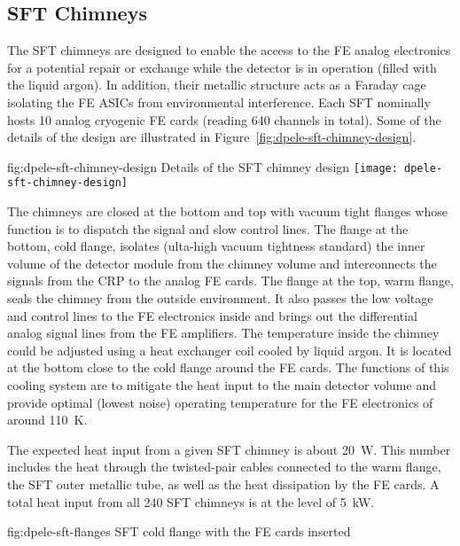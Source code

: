\subsection{SFT Chimneys}
\label{sec:fddp-tpc-elec-design-sft}

The SFT chimneys are designed to enable the access to the FE analog electronics for a potential repair or exchange while the detector is in operation (filled with the liquid argon). In addition, their metallic structure acts as a Faraday cage isolating the FE ASICs from environmental interference.  Each SFT nominally hosts \num{10} analog cryogenic FE cards (reading \num{640} channels in total).  Some of the details of the design are illustrated in Figure~\ref{fig:dpele-sft-chimney-design}. 

\begin{dunefigure}{fig:dpele-sft-chimney-design}
{Details of the SFT chimney design}
\texttt{[image: dpele-sft-chimney-design]}
\end{dunefigure}

The chimneys are closed at the bottom and top with vacuum tight flanges whose function is to dispatch the signal and slow control lines. The flange at the bottom, cold flange, isolates (ulta-high vacuum tightness standard) the inner volume of the detector module from the chimney volume and interconnects the signals from the CRP to the analog FE cards. The flange at the top, warm flange, seals the chimney from the outside environment. It also passes the low voltage and control lines to the FE electronics inside and brings out the differential analog signal lines from the FE amplifiers. The temperature inside the chimney could be adjusted using a heat exchanger coil cooled by liquid argon. It is located at the bottom close to the cold flange around the FE cards. The functions of this cooling system are to mitigate the heat input to the main detector volume and provide optimal (lowest noise) operating temperature for the FE electronics of around \SI{110}{K}. 

The expected heat input from a given SFT chimney is about \SI{20}{\watt}. This number includes the heat through the twisted-pair cables connected to the warm flange, the SFT outer metallic tube, as well as the heat dissipation by the FE cards. A total heat input from all \num{240} SFT chimneys is at the level of \SI{5}{\kilo\watt}. 

\begin{dunefigure}{fig:dpele-sft-flanges}
{SFT cold flange with the FE cards inserted}
\end{dunefigure}


